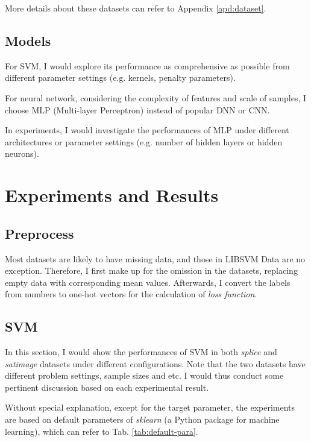 \documentclass[12pt,a4paper]{article}
\theoremstyle{definition}
\begin{document}
\vspace{0.01\linewidth}
More details about these datasets can refer to Appendix \ref{apd:dataset}.

\subsection{Models}

For SVM, I would explore its performance as comprehensive as possible from different parameter settings (e.g. kernels, penalty parameters).

\vspace{0.01\linewidth}
For neural network, considering the complexity of features and scale of samples, I choose MLP (Multi-layer Perceptron) instead of popular DNN or CNN.

\vspace{0.01\linewidth}
In experiments, I would investigate the performances of MLP under different architectures or parameter settings (e.g. number of hidden layers or hidden neurons).

\section{Experiments and Results}

\subsection{Preprocess}

Most datasets are likely to have missing data, and those in LIBSVM Data are no exception. Therefore, I first make up for the omission in the datasets, replacing empty data with corresponding mean values. Afterwards, I convert the labels from numbers to one-hot vectors for the calculation of \textit{loss function}.

\subsection{SVM}
\label{sec:svm}

In this section, I would show the performances of SVM in both \textit{splice} and \textit{satimage} datasets under different configurations. Note that the two datasets have different problem settings, sample sizes and etc. I would thus conduct some pertinent discussion based on each experimental result.

\vspace{0.01\linewidth}
Without special explanation, except for the target parameter, the experiments are based on default parameters of \textit{sklearn} \cite{sklearn} (a Python package for machine learning), which can refer to Tab. \ref{tab:default-para}.
\end{document}
